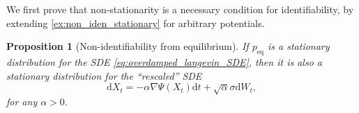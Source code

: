\documentclass[twoside]{article}
\newcommand{\R} {\mathbb R}
\newtheorem{prop}[theorem]{Proposition}
\begin{document}
We first prove that non-stationarity is a necessary condition for identifiability, by extending \cref{ex:non_iden_stationary} for arbitrary potentials.




\begin{prop}[Non-identifiability from equilibrium]
If $p_\mathrm{eq}$ is a stationary distribution for the SDE \eqref{eq:overdamped_langevin_SDE}, then it is also a stationary distribution for the ``rescaled'' SDE
\begin{equation}
    \mathrm{d}X_t = -\alpha\nabla \Psi(X_t) \mathrm{d}t + \sqrt{\alpha}\sigma \mathrm{d}W_t,
\label{eq:rescaled}
\end{equation}
for any $\alpha>0$.
%
\label{prop:stationary_non_iden}
\end{prop}
\end{document}
